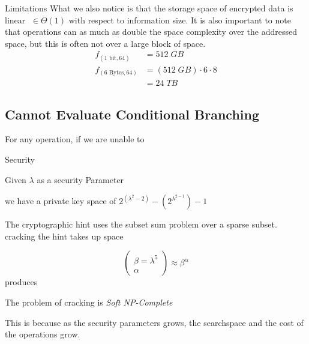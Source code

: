 \documentclass[a0,portrait]{a0poster}
\begin{document}
\begin{multicols}{2}
\begin{slide}{Limitations}
  What we also notice is that the storage space of encrypted data is linear \(\;\in\Theta(1)\) with respect to information size.  It is also important to note that operations can as much as double the space complexity over the addressed space, but this is often not over a large block of space.
\begin{align*}
f_{(1\text{ bit},64)}&=512\; GB\\
f_{(6\text{ Bytes},64)}&=(512\; GB)\cdot6\cdot 8\\&=24\; TB
\end{align*}

\subsection*{Cannot Evaluate Conditional Branching}
For any operation, if we are unable to 

\end{slide}

\begin{slide}{Security}

Given \(\lambda\) as a security Parameter 

we have a private key space of \(2^{(\lambda^2-2)} - (2^{\lambda^{2-1}})-1\)

The cryptographic hint uses the subset sum problem over a sparse subset. cracking the hint takes up space 

\[\left(\begin{matrix}\beta = \lambda^5\\\alpha \end{matrix}\right)\approx \beta^\alpha\] produces


The problem of cracking is {\em Soft NP-Complete}

This is because as the security parameters grows, the searchspace and the cost of the operations grow. 
\end{slide}

\end{multicols}
\end{document}
